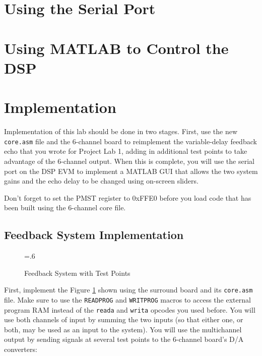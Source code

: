 \documentclass[11pt]{handout}
\begin{document}
\setlength{\baselineskip}{0.5cm}
\setlength{\parskip}{0.5cm}

\makeboxtitle
\vspace{0.3cm}

\section{Using the Serial Port}



\section{Using MATLAB to Control the DSP}



\section{Implementation}

Implementation of this lab should be done in two stages. First, use
the new \verb+core.asm+ file and the 6-channel board to reimplement
the variable-delay feedback echo that you wrote for Project Lab 1,
adding in additional test points to take advantage of the 6-channel
output. When this is complete, you will use the serial port on the DSP
EVM to implement a MATLAB GUI that allows the two system gains and the
echo delay to be changed using on-screen sliders. 

Don't forget to set the PMST register to 0xFFE0 before you load code
that has been built using the 6-channel core file.

\subsection{Feedback System Implementation}

\begin{figure}[htb]\centerline  {
\epsfxsize=.6\textwidth\
          }
\caption{Feedback System with Test Points}
\label{fig: system}
\end{figure}

First, implement the Figure \ref{fig: system} shown using the 
surround board and its \verb+core.asm+ file. Make
sure to use the \verb+READPROG+ and \verb+WRITPROG+ macros to access
the external program RAM instead of the \verb+reada+ and \verb+writa+
opcodes you used before.  You will use both channels of input by summing
the two inputs (so that either one, or both, may be used as an input to
the system). You will use the multichannel output by sending signals at
several test points to the 6-channel board's D/A converters:
\end{document}
